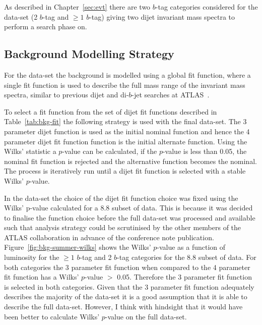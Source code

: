 As described in Chapter~\ref{sec:evt}
there are two $b$-tag categories considered for the \summer{} data-set 
(2 $b$-tag and $\geq1$ $b$-tag)
giving two dijet invariant mass spectra to perform a search phase on.

\subsection{Background Modelling Strategy}
\label{sec:bkg-summer_global}

For the \summer{} data-set the background is modelled using a global fit function,
where a single fit function is used to describe the full mass range of the invariant mass spectra,
similar to previous dijet and di-$b$-jet searches at ATLAS~\cite{dijet-mori16_paper,dibjet-mori16_paper}.

To select a fit function from the set of dijet fit functions described in Table~\ref{tab:bkg-fit} the following strategy is used with the final data-set.
The 3 parameter dijet function is used as the initial nominal function and hence the 4 parameter dijet fit function function is the initial alternate function.
Using the Wilks' statistic a \mbox{$p$-value} can be calculated,
if the \mbox{$p$-value} is less than 0.05, the nominal fit function is rejected and the alternative function becomes the nominal.
The process is iteratively run until a dijet fit function is selected with a stable Wilks' \mbox{$p$-value}.

In the \summer{} data-set the choice of the dijet fit function choice was fixed using the Wilks' p-value calculated for a 8.8 \ifb{} subset of data.
This is because it was decided to finalise the function choice before the full data-set was processed and available
such that analysis strategy could be scrutinised by the other members of the ATLAS collaboration in advance of the conference note publication.
Figure~\ref{fig:bkg-summer-wilks} shows the Wilks' \mbox{$p$-value} as a function of luminosity
for the $\geq1$ $b$-tag and 2 $b$-tag categories for the 8.8 \ifb{} subset of data.
For both categories the 3 parameter fit function when compared to the 4 parameter fit function
has a Wilks' \mbox{$p$-value} $>$ 0.05.
Therefore the 3 parameter fit function is selected in both categories.
Given that the 3 parameter fit function adequately describes the majority of the data-set it is a good assumption that it is able to describe the full data-set.
However, I think with hindsight that it would have been better to calculate Wilks' \mbox{$p$-value} on the full data-set.


